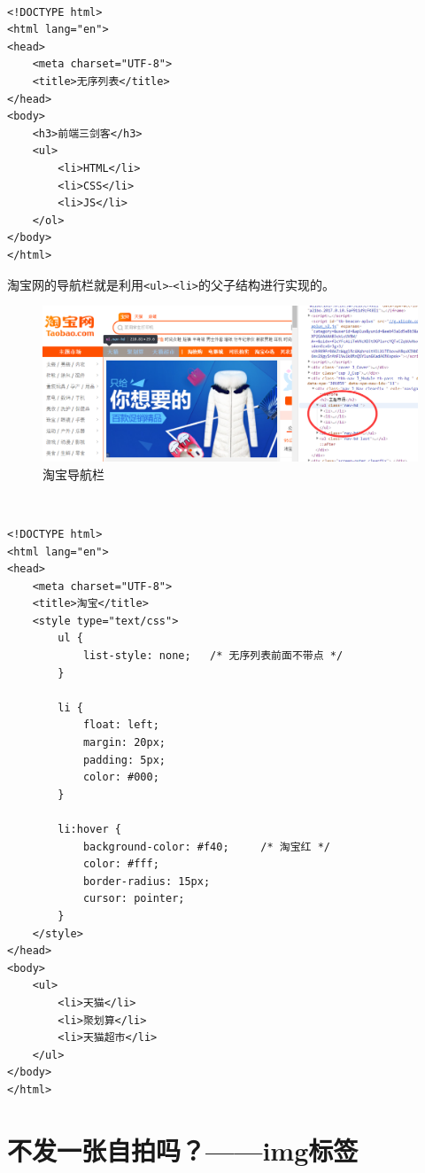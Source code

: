  \\
\begin{lstlisting}[style=htmlcssjs]
<!DOCTYPE html>
<html lang="en">
<head>
    <meta charset="UTF-8">
    <title>无序列表</title>
</head>
<body>
    <h3>前端三剑客</h3>
    <ul>
        <li>HTML</li>
        <li>CSS</li>
        <li>JS</li>
    </ol>
</body>
</html>
\end{lstlisting}

淘宝网的导航栏就是利用\lstinline|<ul>|-\lstinline|<li>|的父子结构进行实现的。

\begin{figure}[H]
    \centering
    \includegraphics[scale=0.5]{img/C3/3-2/2.png}
    \caption{淘宝导航栏}
\end{figure}

 \\
\begin{lstlisting}[style=htmlcssjs]
<!DOCTYPE html>
<html lang="en">
<head>
    <meta charset="UTF-8">
    <title>淘宝</title>
    <style type="text/css">
        ul {
            list-style: none;   /* 无序列表前面不带点 */
        }

        li {
            float: left;
            margin: 20px;
            padding: 5px;
            color: #000;
        }

        li:hover {
            background-color: #f40;     /* 淘宝红 */
            color: #fff;
            border-radius: 15px;
            cursor: pointer;
        }
    </style>
</head>
<body>
    <ul>
        <li>天猫</li>
        <li>聚划算</li>
        <li>天猫超市</li>
    </ul>
</body>
</html>
\end{lstlisting}

\newpage

\section{不发一张自拍吗？——img标签}

